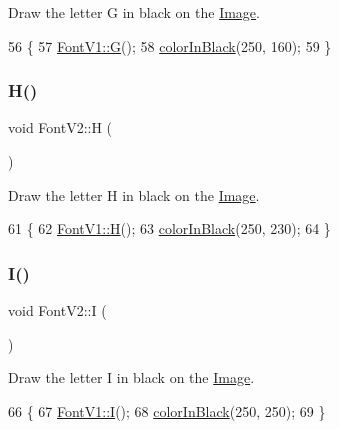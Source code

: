 Draw the letter G in black on the \mbox{\hyperlink{class_image}{Image}}. 


\begin{DoxyCode}
56                \{
57     \mbox{\hyperlink{class_font_v1_a9806041ba05556826ba6b4a0760fcee4}{FontV1::G}}();
58     \mbox{\hyperlink{class_font_v2_a04f2501961bc286ce70fbb6a840b0e8a}{colorInBlack}}(250, 160);
59 \}
\end{DoxyCode}
\mbox{\label{class_font_v2_af03f8d436cc22f57b2bdd471b265896e}} 
\subsubsection{\texorpdfstring{H()}{H()}}
{\footnotesize\ttfamily void Font\+V2\+::H (\begin{DoxyParamCaption}{ }\end{DoxyParamCaption})}



Draw the letter H in black on the \mbox{\hyperlink{class_image}{Image}}. 


\begin{DoxyCode}
61                \{
62     \mbox{\hyperlink{class_font_v1_aac6c3d7f8116c21fd9339d07aa63a797}{FontV1::H}}();
63     \mbox{\hyperlink{class_font_v2_a04f2501961bc286ce70fbb6a840b0e8a}{colorInBlack}}(250, 230);
64 \}
\end{DoxyCode}
\mbox{\label{class_font_v2_aaace3b75c86f0536789a232f5b38321d}} 
\subsubsection{\texorpdfstring{I()}{I()}}
{\footnotesize\ttfamily void Font\+V2\+::I (\begin{DoxyParamCaption}{ }\end{DoxyParamCaption})}



Draw the letter I in black on the \mbox{\hyperlink{class_image}{Image}}. 


\begin{DoxyCode}
66                \{
67     \mbox{\hyperlink{class_font_v1_aab86d5ae867a26e0384c919f82f0bcf1}{FontV1::I}}();
68     \mbox{\hyperlink{class_font_v2_a04f2501961bc286ce70fbb6a840b0e8a}{colorInBlack}}(250, 250);
69 \}
\end{DoxyCode}
\mbox{\label{class_font_v2_a6cc91c88325f086dc95cd733ebda7849}} 
